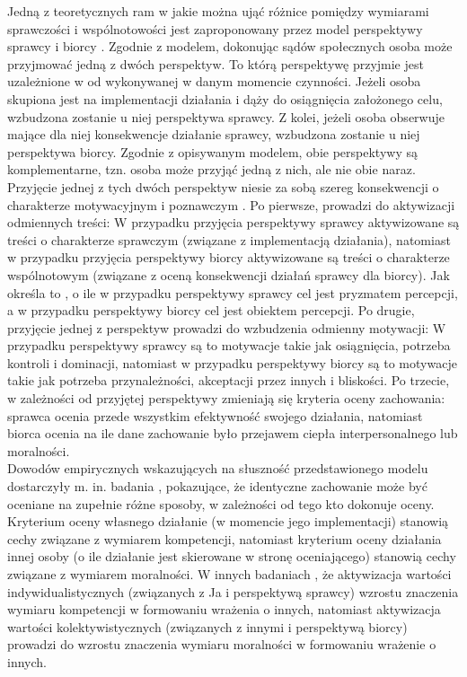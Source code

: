 \documentclass[man]{apa6}
\begin{document}
Jedną z teoretycznych ram w jakie można ująć różnice pomiędzy wymiarami sprawczości i wspólnotowości jest zaproponowany przez \textcite{wojciszke2006perspektywa} model perspektywy sprawcy i biorcy \parencite[w ostatnich opracowaniach określany również jako model perspektywy aktora i obserwatora,][]{abele2014communal}. Zgodnie z modelem, dokonując sądów społecznych osoba może przyjmować jedną z dwóch perspektyw. To którą perspektywę przyjmie jest uzależnione w od wykonywanej w danym momencie czynności. Jeżeli osoba skupiona jest na implementacji działania i dąży do osiągnięcia założonego celu, wzbudzona zostanie u niej perspektywa sprawcy. Z kolei, jeżeli osoba obserwuje mające dla niej konsekwencje działanie sprawcy, wzbudzona zostanie u niej perspektywa biorcy. Zgodnie z opisywanym modelem, obie perspektywy są komplementarne, tzn. osoba może przyjąć jedną z nich, ale nie obie naraz.\\

Przyjęcie jednej z tych dwóch perspektyw niesie za sobą szereg konsekwencji o charakterze motywacyjnym i poznawczym \parencite[patrz,][]{wojciszke2010sprawczosc}. Po pierwsze, prowadzi do aktywizacji odmiennych treści: W przypadku przyjęcia perspektywy sprawcy aktywizowane są treści o charakterze sprawczym (związane z implementacją działania), natomiast w przypadku przyjęcia perspektywy biorcy aktywizowane są treści o charakterze wspólnotowym (związane z oceną konsekwencji działań sprawcy dla biorcy). Jak określa to \textcite{wojciszke2010sprawczosc}, o ile w przypadku perspektywy sprawcy cel jest pryzmatem percepcji, a w przypadku perspektywy biorcy cel jest obiektem percepcji. Po drugie, przyjęcie jednej z perspektyw prowadzi do wzbudzenia odmienny motywacji: W przypadku perspektywy sprawcy są to motywacje takie jak osiągnięcia, potrzeba kontroli i dominacji, natomiast w przypadku perspektywy biorcy są to motywacje takie jak potrzeba przynależności, akceptacji przez innych i bliskości. Po trzecie, w zależności od przyjętej perspektywy zmieniają się kryteria oceny zachowania: sprawca ocenia przede wszystkim efektywność swojego działania, natomiast biorca ocenia na ile dane zachowanie było przejawem ciepła interpersonalnego lub moralności.\\

Dowodów empirycznych wskazujących na słuszność przedstawionego modelu dostarczyły m. in. badania \textcite{wojciszke1994multiple}, pokazujące, że identyczne zachowanie może być oceniane na zupełnie różne sposoby, w zależności od tego kto dokonuje oceny. Kryterium oceny własnego działanie (w momencie jego implementacji) stanowią cechy związane z wymiarem kompetencji, natomiast kryterium oceny działania innej osoby (o ile działanie jest skierowane w stronę oceniającego) stanowią cechy związane z wymiarem moralności. W innych badaniach \parencite{wojciszke1997parallels}, że aktywizacja wartości indywidualistycznych (związanych z Ja i perspektywą sprawcy) wzrostu znaczenia wymiaru kompetencji w formowaniu wrażenia o innych, natomiast aktywizacja wartości kolektywistycznych (związanych z innymi i perspektywą biorcy) prowadzi do wzrostu znaczenia wymiaru moralności w formowaniu wrażenie o innych.\\
\end{document}
